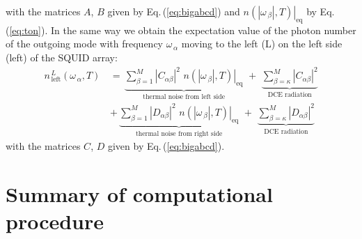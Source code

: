 %
with the matrices $A$, $B$ given by Eq.\,(\ref{eq:bigabcd}) and 
$\left. n(|\omega_{\,\beta}|, T) \right|_{\text{eq}}$ by Eq.\,(\ref{eq:ton}). 
In the same way we obtain the
expectation value of the photon number of the outgoing mode with frequency 
$\omega_{\,\alpha}$ moving to the left (L) on the left side (left) of the SQUID array:
%
\begin{equation} \label{eq:dce_left}
\begin{split}
n_{\,\text{left}}^{\,L}(\omega_{\,\alpha}, T) \, & = \,
\underbrace{\sum\limits_{\beta=1}^{M} \left|C_{\alpha \beta}\right|^2 \, \,
\left. n(|\omega_{\,\beta}|, T) \right|_{\text{eq}}}_{\text{thermal noise from left side}}
\, \, + \, \,
\underbrace{\sum\limits_{\beta=\kappa}^{M} \left|C_{\alpha \beta}\right|^2}_{\text{DCE radiation}} \\[4mm]
& + \, \underbrace{\sum\limits_{\beta=1}^{M} \left|D_{\alpha \beta}\right|^2 \, \,
\left. n(|\omega_{\,\beta}|, T) \right|_{\text{eq}}}_{\text{thermal noise from right side}}
\, \, + \, \,
\underbrace{\sum\limits_{\beta=\kappa}^{M} \left|D_{\alpha \beta}\right|^2}_{\text{DCE radiation}}
\end{split}
\end{equation}
%
with the matrices $C$, $D$ given by Eq.\,(\ref{eq:bigabcd}). 







\section{Summary of computational procedure}
\label{sec:summary}

